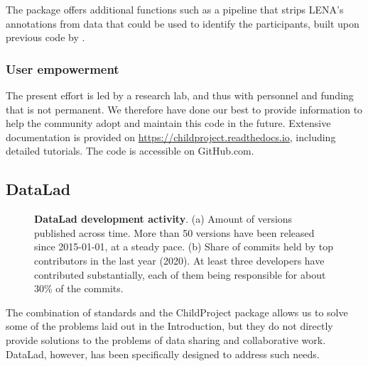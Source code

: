 \documentclass[smallextended]{svjour3}       %
\begin{document}
The package offers additional functions such as a pipeline that strips LENA's annotations from data that could be used to identify the participants, built upon previous code by \citet{eaf-anonymizer-original}.

\subsubsection*{User empowerment}

The present effort is led by a research lab, and thus with personnel and funding that is not permanent. We therefore have done our best to provide information to help the community adopt and maintain this code in the future. Extensive documentation is provided on \url{https://childproject.readthedocs.io}, including detailed tutorials. The code is accessible on GitHub.com.


\subsection{DataLad}\label{section:datalad}

\begin{figure}[htb]
\centering
\begin{minipage}{.5\linewidth}
\centering
\subfloat[]{\label{datalad:a}\resizebox{!}{0.70\linewidth}{\large\normalsize}}
\end{minipage}%
\begin{minipage}{.5\linewidth}
\centering
\subfloat[]{\label{datalad:b}\resizebox{!}{0.70\linewidth}{\large\normalsize}}
\end{minipage}\par\medskip


\caption{\label{fig:datalad}\textbf{DataLad development activity}. (a) Amount of versions published across time. More than 50 versions have been released since 2015-01-01, at a steady pace. (b) Share of commits held by top contributors in the last year (2020). At least three developers have contributed substantially, each of them being responsible for about 30\% of the commits.}

\end{figure}

The combination of standards and the ChildProject package allows us to solve some of the problems laid out in the Introduction, but they do not directly provide solutions to the problems of data sharing and collaborative work. DataLad, however, has been specifically designed to address such needs.
\end{document}
